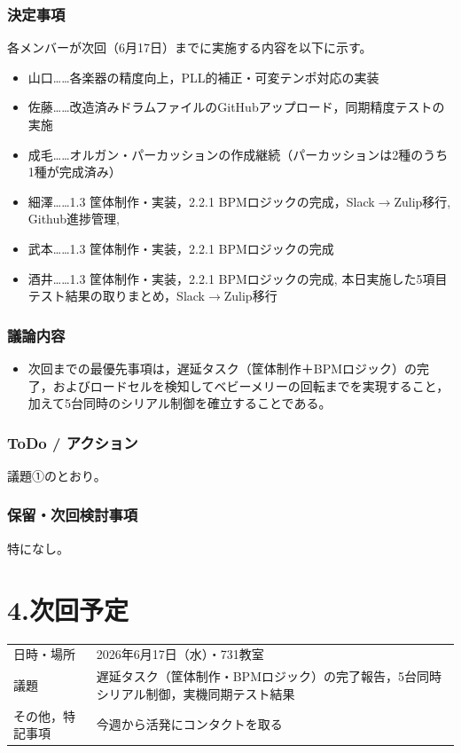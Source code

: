 \documentclass[a4paper,12pt]{ltjsarticle}
\begin{document}
\subsubsection*{決定事項}
各メンバーが次回（6月17日）までに実施する内容を以下に示す。
\begin{itemize}[leftmargin=1.5em]
  \item 山口……各楽器の精度向上，PLL的補正・可変テンポ対応の実装
  \item 佐藤……改造済みドラムファイルのGitHubアップロード，同期精度テストの実施
  \item 成毛……オルガン・パーカッションの作成継続（パーカッションは2種のうち1種が完成済み）
  \item 細澤……1.3 筐体制作・実装，2.2.1 BPMロジックの完成，Slack$\to$Zulip移行, Github進捗管理, 
  \item 武本……1.3 筐体制作・実装，2.2.1 BPMロジックの完成
  \item 酒井……1.3 筐体制作・実装，2.2.1 BPMロジックの完成, 本日実施した5項目テスト結果の取りまとめ，Slack$\to$Zulip移行
\end{itemize}

\subsubsection*{議論内容}
\begin{itemize}[leftmargin=1.5em]
  \item 次回までの最優先事項は，遅延タスク（筐体制作＋BPMロジック）の完了，およびロードセルを検知してベビーメリーの回転までを実現すること，加えて5台同時のシリアル制御を確立することである。
\end{itemize}

\subsubsection*{ToDo / アクション}
議題①のとおり。

\subsubsection*{保留・次回検討事項}
特になし。

\section*{4.次回予定}
\begin{tabular}{ll}
  \toprule
  日時・場所 & 2026年6月17日（水）・731教室 \\
  議題       & 遅延タスク（筐体制作・BPMロジック）の完了報告，5台同時シリアル制御，実機同期テスト結果 \\
  その他，特記事項 & 今週から活発にコンタクトを取る \\
  \bottomrule
\end{tabular}
\end{document}
